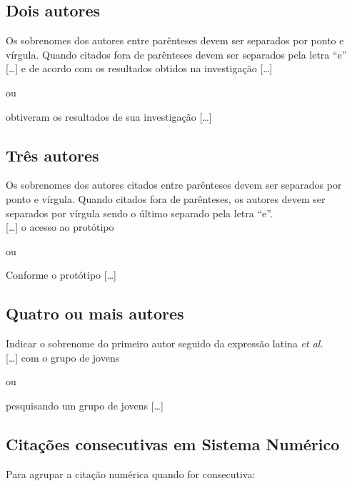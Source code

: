 \subsection{Dois autores}

Os sobrenomes dos autores entre par\^enteses devem ser separados por ponto e vírgula. Quando citados fora de par\^enteses devem ser separados pela letra “e”\\

[\ldots] \cite{Ramos2014} e de acordo com os resultados obtidos na investigação [\ldots] 

ou 

 obtiveram os resultados de sua investigação [\ldots] \\

\subsection{Tr\^es autores}

Os sobrenomes dos autores citados entre par\^enteses devem ser separados por ponto e vírgula. Quando citados fora de par\^enteses, os autores devem ser separados por vírgula sendo o último separado pela letra “e”.\\

[\ldots] o acesso ao protótipo \cite{Oliveira2013}

ou

Conforme  o protótipo [\ldots]\\

\subsection{Quatro ou mais autores}

Indicar o sobrenome do primeiro autor seguido da expressão latina \textit{et al.}\\

[\ldots]  com o grupo de jovens \cite{Sena2012}

ou

 pesquisando um grupo de jovens [\ldots]\\

\subsection{Citações consecutivas em Sistema Num\'erico}

Para agrupar a citação num\'erica quando for consecutiva:

